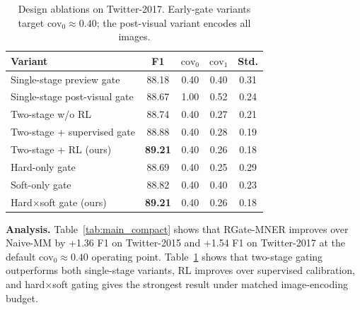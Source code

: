 \documentclass{llncs}
\begin{document}
\begin{table}[!htbp]
\caption{Design ablations on Twitter-2017. Early-gate variants target $\mathrm{cov}_0\approx0.40$; the post-visual variant encodes all images.}
\centering
\footnotesize
\setlength{\tabcolsep}{4pt}
\renewcommand{\arraystretch}{0.95}
\begin{tabular}{lcccc}
\toprule
Variant & F1 & $\mathrm{cov}_0$ & $\mathrm{cov}_1$ & Std. \\
\midrule
Single-stage preview gate & 88.18 & 0.40 & 0.40 & 0.31 \\
Single-stage post-visual gate & 88.67 & 1.00 & 0.52 & 0.24 \\
Two-stage w/o RL & 88.74 & 0.40 & 0.27 & 0.21 \\
Two-stage + supervised gate & 88.88 & 0.40 & 0.28 & 0.19 \\
Two-stage + RL (ours) & \textbf{89.21} & 0.40 & 0.26 & 0.18 \\
\midrule
Hard-only gate & 88.69 & 0.40 & 0.25 & 0.29 \\
Soft-only gate & 88.82 & 0.40 & 0.40 & 0.23 \\
Hard$\times$soft gate (ours) & \textbf{89.21} & 0.40 & 0.26 & 0.18 \\
\bottomrule
\end{tabular}
\label{tab:design_ablation}
\end{table}
\FloatBarrier

\noindent\textbf{Analysis.}
Table~\ref{tab:main_compact} shows that RGate-MNER improves over Naive-MM by +1.36 F1 on Twitter-2015 and +1.54 F1 on Twitter-2017 at the default $\mathrm{cov}_0\approx0.40$ operating point. Table~\ref{tab:design_ablation} shows that two-stage gating outperforms both single-stage variants, RL improves over supervised calibration, and hard$\times$soft gating gives the strongest result under matched image-encoding budget.

\FloatBarrier
\end{document}
